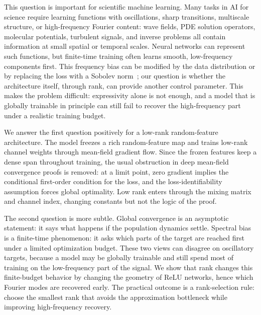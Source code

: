 \documentclass{article}
\begin{document}
This question is important for scientific machine learning. Many tasks in AI for science require learning functions with oscillations, sharp transitions, multiscale structure, or high-frequency Fourier content: wave fields, PDE solution operators, molecular potentials, turbulent signals, and inverse problems all contain information at small spatial or temporal scales. Neural networks can represent such functions, but finite-time training often learns smooth, low-frequency components first. This frequency bias can be modified by the data distribution or by replacing the loss with a Sobolev norm~\cite{yu2022tuning}; our question is whether the architecture itself, through rank, can provide another control parameter. This makes the problem difficult: expressivity alone is not enough, and a model that is globally trainable in principle can still fail to recover the high-frequency part under a realistic training budget.

We answer the first question positively for a low-rank random-feature architecture. The model freezes a rich random-feature map and trains low-rank channel weights through mean-field gradient flow. Since the frozen features keep a dense span throughout training, the usual obstruction in deep mean-field convergence proofs is removed: at a limit point, zero gradient implies the conditional first-order condition for the loss, and the loss-identifiability assumption forces global optimality. Low rank enters through the mixing matrix and channel index, changing constants but not the logic of the proof.

The second question is more subtle. Global convergence is an asymptotic statement: it says what happens if the population dynamics settle. Spectral bias is a finite-time phenomenon: it asks which parts of the target are reached first under a limited optimization budget. These two views can disagree on oscillatory targets, because a model may be globally trainable and still spend most of training on the low-frequency part of the signal. We show that rank changes this finite-budget behavior by changing the geometry of ReLU networks, hence which Fourier modes are recovered early. The practical outcome is a rank-selection rule: choose the smallest rank that avoids the approximation bottleneck while improving high-frequency recovery.
\end{document}

